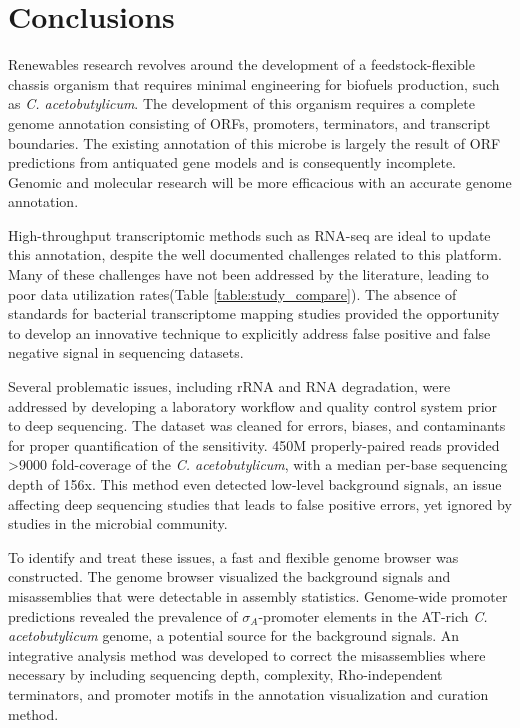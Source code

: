 
\chapter{Conclusions}

Renewables research revolves around the development of a feedstock-flexible chassis organism that requires minimal engineering for biofuels production, such as \textit{C. acetobutylicum}. The development of this organism requires a complete genome annotation consisting of ORFs, promoters, terminators, and transcript boundaries. The existing annotation of this microbe is largely the result of ORF predictions from antiquated gene models and is consequently incomplete. Genomic and molecular research will be more efficacious with an accurate genome annotation.

High-throughput transcriptomic methods such as RNA-seq are ideal to update this annotation, despite the well documented challenges related to this platform. Many of these challenges have not been addressed by the literature, leading to poor data utilization rates(Table \ref{table:study_compare}). The absence of standards for bacterial transcriptome mapping studies provided the opportunity to develop an innovative technique to explicitly address false positive and false negative signal in sequencing datasets.

Several problematic issues, including rRNA and RNA degradation, were addressed by developing a laboratory workflow and quality control system prior to deep sequencing. The dataset was cleaned for errors, biases, and contaminants for proper quantification of the sensitivity. 450M properly-paired reads provided \textgreater 9000 fold-coverage of the \textit{C. acetobutylicum}, with a median per-base sequencing depth of 156x. This method even detected low-level background signals, an issue affecting deep sequencing studies that leads to false positive errors, yet ignored by studies in the microbial community. 

To identify and treat these issues, a fast and flexible genome browser was constructed. The genome browser visualized the background signals and misassemblies that were detectable in assembly statistics. Genome-wide promoter predictions revealed the prevalence of $\sigma_{A}$-promoter elements in the AT-rich \textit{C. acetobutylicum} genome, a potential source for the background signals. An integrative analysis method was developed to correct the misassemblies where necessary by including sequencing depth, complexity, Rho-independent terminators, and promoter motifs in the annotation visualization and curation method.

